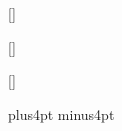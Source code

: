 
\usepackage[letterpaper, margin = 1in]{geometry}

\usepackage{titlesec}
[]
[]
\titleformat{\subsubsection}[block]{\normalfont}{}{.5em}{}[\vspace{-1em}]

\newcommand{\E}{\mathrm{I\! E}}
\renewcommand{\P}{\mathrm{I\! P}}

\skip\footins 20pt plus4pt minus4pt
